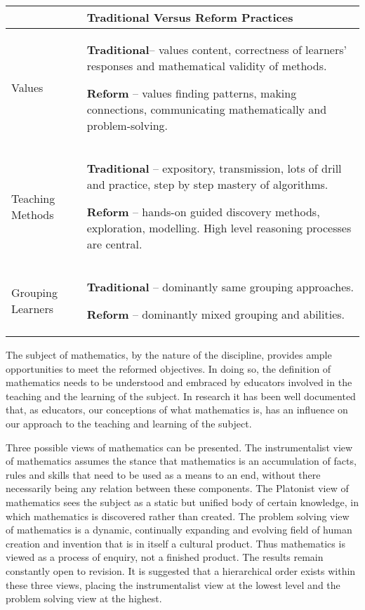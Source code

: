 \begin{table}[H]
\begin{center}
 \begin{tabular}{|p{3.5cm}|p{8.5cm}|} \hline 
  
& \textbf{Traditional Versus Reform Practices} \\ \hline
Values & \textbf{Traditional}– values content, correctness of learners’ responses and mathematical validity of methods. \par
\textbf{Reform} – values finding patterns, making connections, communicating mathematically and problem-solving. \\ \hline
Teaching Methods &
\textbf{Traditional} – expository, transmission, lots of drill and practice, step by step mastery of algorithms.\par
\textbf{Reform} – hands-on guided discovery methods, exploration, modelling. High level reasoning processes are central. \\ \hline
Grouping Learners & \textbf{Traditional} – dominantly same grouping approaches. \par
\textbf{Reform} – dominantly mixed grouping and abilities. \\ \hline


 \end{tabular}
\end{center}
\end{table}

The subject of mathematics, by the nature of the discipline, provides ample opportunities to meet the reformed objectives. In doing so, the definition of mathematics needs to be understood and embraced by educators involved in the teaching and the learning of the subject. In research it has been well documented that, as educators, our conceptions of what mathematics is, has an influence on our approach to the teaching and learning of the subject. \par

Three possible views of mathematics can be presented. The instrumentalist view of mathematics assumes the stance that mathematics is an accumulation of facts, rules and skills that need to be used as a means to an end, without there necessarily being any relation between these components. The Platonist view of mathematics sees the subject as a static but unified body of certain knowledge, in which mathematics is discovered rather than created. The problem solving view of mathematics is a dynamic, continually expanding and evolving field of human creation and invention that is in itself a cultural product. Thus mathematics is viewed as a process of enquiry, not a finished product. The results remain constantly open to revision. It is suggested that a hierarchical order exists within these three views, placing the instrumentalist view at the lowest level and the problem solving view at the highest.
